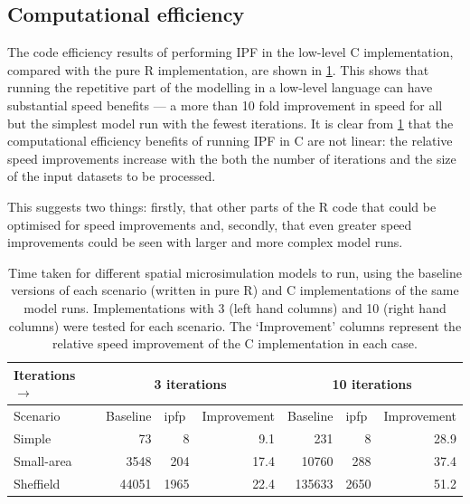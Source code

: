 \documentclass[a4paper,10pt]{article}
\begin{document}
\subsection{Computational efficiency} \label{sspeedr}

The code efficiency
results of performing IPF in the low-level C implementation, compared with
the pure R implementation, are shown in \cref{tspeed}. This shows that running
the repetitive part of the modelling in a low-level language can have
substantial speed benefits --- a more than 10 fold improvement in speed for
all but the simplest model run with the fewest iterations. It is clear from
\cref{tspeed} that the computational efficiency benefits of running IPF in C
are not linear: the relative speed improvements increase with the both the
number of iterations and the size of the input datasets to be processed.

This suggests two things: firstly, that other parts of the R code
that could be optimised for speed improvements
and, secondly, that even greater speed improvements could be seen
with larger and more complex model runs.

\begin{table}[htbp]
    \begin{center}
\caption{Time taken for different spatial microsimulation models to run, using
    the baseline versions of each scenario (written in pure R) and C
    implementations of the same model runs. Implementations with
    3 (left hand columns) and 10 (right hand columns) were tested for each
    scenario. The `Improvement' columns represent the
    relative speed improvement of the C implementation in each case.}
\begin{tabular}{lrrrrrr}
\toprule
Iterations $\rightarrow$ & \multicolumn{ 3}{c}{3 iterations} & \multicolumn{ 3}{c}{10 iterations} \\
\midrule Scenario & \multicolumn{1}{l}{Baseline} & \multicolumn{1}{l}{ipfp} & \multicolumn{1}{l}{Improvement} & \multicolumn{1}{l}{Baseline} & \multicolumn{1}{l}{ipfp} & \multicolumn{1}{l}{Improvement} \\
\midrule
Simple & 73 & 8 & 9.1 & 231 & 8 & 28.9 \\ 
Small-area & 3548 & 204 & 17.4 & 10760 & 288 & 37.4 \\ 
Sheffield & 44051 & 1965 & 22.4 & 135633 & 2650 & 51.2 \\ 
\bottomrule
\end{tabular}
\label{tspeed}
    \end{center}
\end{table}
\end{document}
